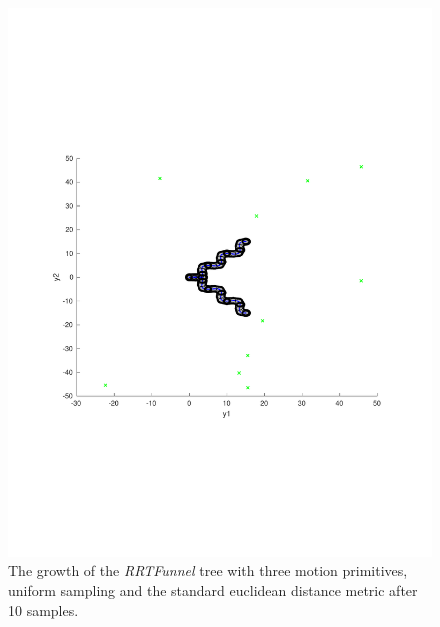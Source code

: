 \begin{figure}
  \includegraphics[scale=.5]{figures/rrtfunnel/rrtfunnel-10samples}
  \caption{The growth of the \textit{RRTFunnel} tree with three motion
    primitives, uniform sampling and the standard euclidean distance metric
    after 10 samples.}
\end{figure}

